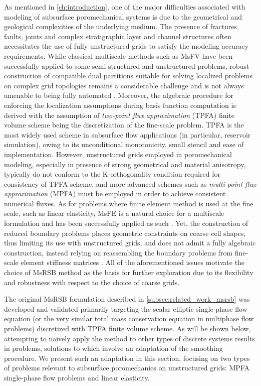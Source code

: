 As mentioned in \cref{ch:introduction}, one of the major difficulties associated with modeling of subsurface poromechanical systems is due to the geometrical and geological complexities of the underlying medium.    The presence of fractures, faults, joints and complex stratigraphic layer and channel structures often necessitates the use of fully unstructured grids to satisfy the modeling accuracy requirements.   While classical multiscale methods such as MsFV have been successfully applied to some semi-structured and unstructured problems, robust construction of compatible dual partitions suitable for solving localized problems on complex grid topologies remains a considerable challenge and is not always amenable to being fully automated \cite{Moyner2014a}.   Moreover, the algebraic procedure for enforcing the localization assumptions during basis function computation is derived with the assumption of \textit{two-point flux approximation} (TPFA) finite volume scheme being the discretization of the fine-scale problem.   TPFA is the most widely used scheme in subsurface flow applications (in particular, reservoir simulation), owing to its unconditional monotonicity, small stencil and ease of implementation.   However, unstructured grids employed in poromechanical modeling, especially in presence of strong geometrical and material anisotropy, typically do not conform to the K-orthogonality condition required for consistency of TPFA scheme, and more advanced schemes such as \textit{multi-point flux approximation} (MPFA) must be employed in order to achieve consistent numerical fluxes.   As for problems where finite element method is used at the fine scale, such as linear elasticity, MsFE is a natural choice for a multiscale formulation and has been successfully applied as such \cite{Buck2013}.   Yet, the construction of reduced boundary problems places geometric constraints on coarse cell shapes, thus limiting its use with unstructured grids, and does not admit a fully algebraic construction, instead relying on reassembling the boundary problems from fine-scale element stiffness matrices \cite{Castelletto2017}.   All of the aforementioned issues motivate the choice of MsRSB method as the basis for further exploration due to its flexibility and robustness with respect to the choice of coarse grids.

The original MsRSB formulation described in \cref{subsec:related_work_msrsb} was developed and validated primarily targeting the scalar elliptic single-phase flow equation (or the very similar total mass conservation equation in multiphase flow problems) discretized with TPFA finite volume scheme.    As will be shown below, attempting to na\"{i}vely apply the method to other types of discrete systems results in problems, solutions to which involve an adaptation of the smoothing procedure.   We present such an adaptation in this section, focusing on two types of problems relevant to subsurface poromechanics on unstructured grids: MPFA single-phase flow problems and linear elasticity.

